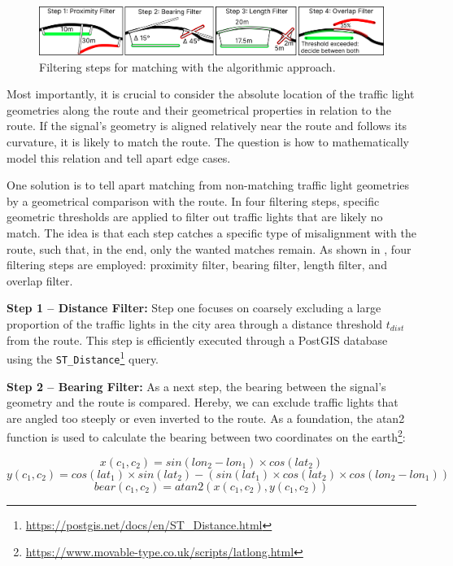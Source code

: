 \begin{figure}[t]
\centering
\includegraphics[width=\linewidth]{images/sg-matching-filters.pdf}
\caption{Filtering steps for matching with the algorithmic approach.}
\label{fig:sg-matching-filters}
\end{figure}

Most importantly, it is crucial to consider the absolute location of the traffic light geometries along the route and their geometrical properties in relation to the route. If the signal's geometry is aligned relatively near the route and follows its curvature, it is likely to match the route. The question is how to mathematically model this relation and tell apart edge cases.

One solution is to tell apart matching from non-matching traffic light geometries by a geometrical comparison with the route. In four filtering steps, specific geometric thresholds are applied to filter out traffic lights that are likely no match. The idea is that each step catches a specific type of misalignment with the route, such that, in the end, only the wanted matches remain. As shown in , four filtering steps are employed: proximity filter, bearing filter, length filter, and overlap filter.

\textbf{\color{cidarkblue}Step 1 -- Distance Filter:} Step one focuses on coarsely excluding a large proportion of the traffic lights in the city area through a distance threshold $t_{dist}$ from the route. This step is efficiently executed through a PostGIS database using the \texttt{ST\_Distance}\footnote{\url{https://postgis.net/docs/en/ST\_Distance.html}} query.

\textbf{\color{cidarkblue}Step 2 -- Bearing Filter:} As a next step, the bearing between the signal's geometry and the route is compared. Hereby, we can exclude traffic lights that are angled too steeply or even inverted to the route. As a foundation, the atan2 function is used to calculate the bearing between two coordinates on the earth\footnote{\url{https://www.movable-type.co.uk/scripts/latlong.html}}:

\begin{equation}
x(c_1, c_2) = sin(lon_2 - lon_1) \times cos(lat_2)
\end{equation}
\begin{equation}
y(c_1, c_2) = cos(lat_1) \times sin(lat_2) - (sin(lat_1) \times cos(lat_2) \times cos(lon_2 - lon_1))
\end{equation}
\begin{equation}
bear(c_1, c_2) = atan2(x(c_1, c_2), y(c_1, c_2))
\end{equation}

